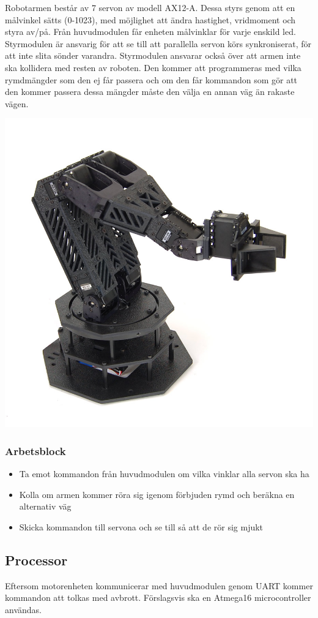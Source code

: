 Robotarmen består av 7 servon av modell AX12-A. Dessa styrs genom att en målvinkel sätts (0-1023), med möjlighet att ändra hastighet, vridmoment och styra av/på. Från huvudmodulen får enheten målvinklar för varje enskild led. Styrmodulen är ansvarig för att se till att parallella servon körs synkroniserat, för att inte slita sönder varandra. Styrmodulen ansvarar också över att armen inte ska kollidera med resten av roboten. Den kommer att programmeras med vilka rymdmängder som den ej får passera och om den får kommandon som gör att den kommer passera dessa mängder måste den välja en annan väg än rakaste vägen.  
\newline
\centerline{\includegraphics[scale=0.4]{arm}}


\subsubsection{Arbetsblock}

\begin{itemize}
\item Ta emot kommandon från huvudmodulen om vilka vinklar alla servon ska ha
\item Kolla om armen kommer röra sig igenom förbjuden rymd och beräkna en alternativ väg
\item Skicka kommandon till servona och se till så att de rör sig mjukt
\end{itemize}

\subsection{Processor}

Eftersom motorenheten kommunicerar med huvudmodulen genom UART kommer kommandon att tolkas med avbrott. Förslagsvis ska en Atmega16 microcontroller användas.